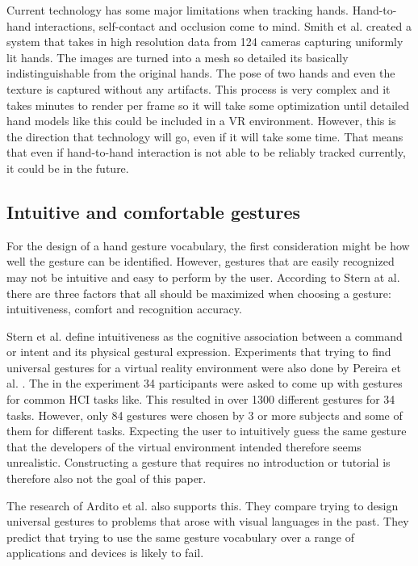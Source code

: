 Current technology has some major limitations when tracking hands.
Hand-to-hand interactions, self-contact and occlusion come to mind.
Smith et al. \cite{Smith} created a system that takes in high resolution data from
124 cameras capturing uniformly lit hands. The images are turned into a
mesh so detailed its basically indistinguishable from the original
hands. The pose of two hands and even the texture is captured without
any artifacts. This process is very complex and it takes minutes to
render per frame so it will take some optimization until detailed hand
models like this could be included in a VR environment. However, this is
the direction that technology will go, even if it will take some time.
That means that even if hand-to-hand interaction is not able to be
reliably tracked currently, it could be in the future.

\subsection{Intuitive and comfortable gestures}\label{ergonomics}
For the design of a hand gesture vocabulary, the first consideration might be how well the gesture can be identified. However, gestures that are easily recognized may not be intuitive and easy to perform by the user. According to Stern at al. \cite{Stern2006} there are three factors that all should be maximized when choosing a gesture: intuitiveness, comfort and recognition accuracy.

Stern et al. define intuitiveness as the cognitive association between a command or intent and its physical gestural expression. Experiments that trying to find universal gestures for a virtual reality environment were also done by Pereira et al. \cite{Pereira2015}. The in the experiment 34 participants were asked to come up with gestures for common HCI tasks like. %
This resulted in over 1300 different gestures for 34 tasks. However, only 84 gestures were chosen by 3 or more subjects and some of them for different tasks. Expecting the user to intuitively guess the same gesture that the developers of the virtual environment intended therefore seems unrealistic. Constructing a gesture that requires no introduction or tutorial is therefore also not the goal of this paper.

The research of Ardito et al. \cite{Ardito2014} also supports this. They compare trying to design universal gestures to problems that arose with visual languages in the past. They predict that trying to use the same gesture vocabulary over a range of applications and devices is likely to fail. 


